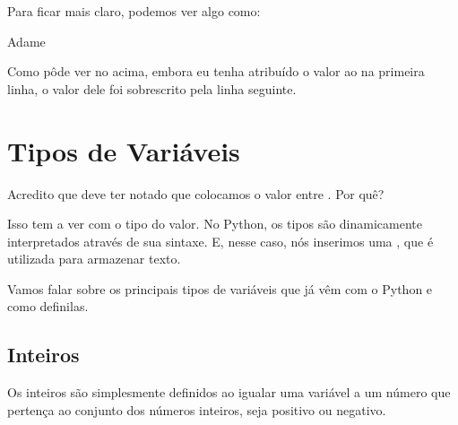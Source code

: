 \documentclass[letterpaper,10pt,english]{jupyterBook}
\begin{document}
\sphinxAtStartPar
Para ficar mais claro, podemos ver algo como:

\begin{sphinxVerbatim}[commandchars=\\\{\}]
  
  
\end{sphinxVerbatim}

\begin{sphinxVerbatim}[commandchars=\\\{\}]
\PYGZsq{}Adame\PYGZsq{}
\end{sphinxVerbatim}

\sphinxAtStartPar
Como pôde ver no  acima, embora eu tenha atribuído o valor  ao  na primeira linha, o valor dele foi sobrescrito pela linha seguinte.


\section{Tipos de Variáveis}
\label{\detokenize{chapters/2:tipos-de-variaveis}}
\sphinxAtStartPar
Acredito que deve ter notado que colocamos o valor entre . Por quê?

\sphinxAtStartPar
Isso tem a ver com o tipo do valor. No Python, os tipos são dinamicamente interpretados através de sua sintaxe. E, nesse caso, nós inserimos uma , que é utilizada para armazenar texto.

\sphinxAtStartPar
Vamos falar sobre os principais tipos de variáveis que já vêm com o Python e como defini\sphinxhyphen{}las.


\subsection{Inteiros}
\label{\detokenize{chapters/2:inteiros}}
\sphinxAtStartPar
Os inteiros são simplesmente definidos ao igualar uma variável a um número que pertença ao conjunto dos números inteiros, seja positivo ou negativo.

\begin{sphinxVerbatim}[commandchars=\\\{\}]
  
\end{sphinxVerbatim}
\end{document}
